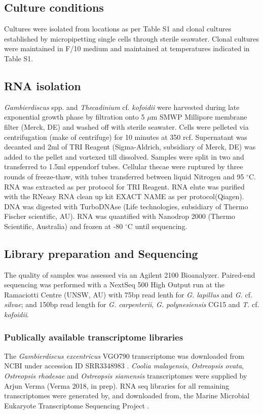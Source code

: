 \documentclass[12pt]{article}
\begin{document}
\subsection*{Culture conditions}
\FloatBarrier
Cultures were isolated from locations as per Table S1 and clonal cultures established by micropipetting single cells through sterile seawater. 
Clonal cultures were maintained in F/10 medium and maintained at temperatures indicated in Table S1. 

\subsection*{RNA isolation}
\emph{Gambierdiscus} spp. and \emph{Thecadinium} cf. \emph{kofoidii} were harvested during late exponential growth phase by filtration onto 5 $\mu$m SMWP Millipore membrane filter (Merck, DE) and washed off with sterile seawater. 
Cells were pelleted via centrifugation (make of centrifuge) for 10 minutes at 350 rcf. 
Supernatant was decanted and 2ml of TRI Reagent (Sigma-Aldrich, subsidiary of Merck, DE) was added to the pellet and vortexed till dissolved. 
Samples were split in two and transferred to 1.5ml eppendorf tubes. 
Cellular thecae were ruptured by three rounds of freeze-thaw, with tubes transferred between liquid Nitrogen and 95 $^{\circ}$C. 
RNA was extracted as per protocol for TRI Reagent. 
RNA elute was purified with the RNeasy RNA clean up kit EXACT NAME as per protocol(Qiagen). 
DNA was digested with TurboDNAse (Life technologies, subsidiary of Thermo Fischer scientific, AU). 
RNA was quantified with Nanodrop 2000 (Thermo Scientific, Australia) and frozen at -80 $^{\circ}$C until sequencing.
 
\subsection*{Library preparation and Sequencing}
The quality of samples was assessed via an Agilent 2100 Bioanalyzer. 
Paired-end sequencing was performed with a NextSeq 500 High Output run at the Ramaciotti Centre (UNSW, AU) with 75bp read lenth for \emph{G. lapillus} and \emph{G.} cf. \emph{silvae}; and 150bp read length for \emph{G. carpenterii}, \emph{G. polynesiensis} CG15 and \emph{T.} cf. \emph{kofoidii}.

\subsubsection*{Publically available transcriptome libraries}
The \emph{Gambierdiscus excentricus} VGO790 transcriptome was downloaded from NCBI under accession ID SRR3348983 \cite{kohli2017role}. 
\textit{Coolia malayensis}, \textit{Ostreopsis ovata}, \textit{Ostreopsis rhodesae} and \textit{Ostreopsis siamensis} transcriptomes were supplied by Arjun Verma (Verma 2018, in prep). 
RNA seq libraries for all remaining transcriptomes were generated by, and downloaded from, the Marine Microbial Eukaryote Transcriptome Sequencing Project \citep{keeling2014marine}.
\end{document}
